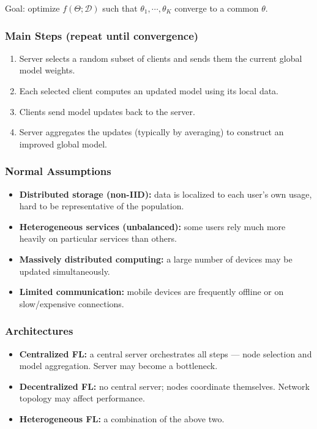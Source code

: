 \documentclass[UTF8]{ctexart}
\begin{document}
Goal: optimize $f(\Theta;\mathcal{D})$ such that $\theta_1, \cdots, \theta_K$ converge to a common $\theta$.

\subsubsection{Main Steps (repeat until convergence)}
\begin{enumerate}
    \item Server selects a random subset of clients and sends them the current global model weights.
    \item Each selected client computes an updated model using its local data.
    \item Clients send model updates back to the server.
    \item Server aggregates the updates (typically by averaging) to construct an improved global model.
\end{enumerate}

\subsubsection{Normal Assumptions}
\begin{itemize}
    \item \textbf{Distributed storage (non-IID):} data is localized to each user's own usage, hard to be representative of the population.
    \item \textbf{Heterogeneous services (unbalanced):} some users rely much more heavily on particular services than others.
    \item \textbf{Massively distributed computing:} a large number of devices may be updated simultaneously.
    \item \textbf{Limited communication:} mobile devices are frequently offline or on slow/expensive connections.
\end{itemize}

\subsubsection{Architectures}
\begin{itemize}
    \item \textbf{Centralized FL:} a central server orchestrates all steps — node selection and model aggregation. Server may become a bottleneck.
    \item \textbf{Decentralized FL:} no central server; nodes coordinate themselves. Network topology may affect performance.
    \item \textbf{Heterogeneous FL:} a combination of the above two.
\end{itemize}
\end{document}
